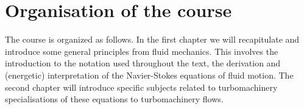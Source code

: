 
\section{Organisation of the course}

The course is organized as follows. In the first chapter we will
recapitulate and introduce some general principles from fluid
mechanics. This involves the introduction to the notation used
throughout the text, the derivation and (energetic) interpretation of
the Navier-Stokes equations of fluid motion. The second chapter will
introduce specific subjects related to turbomachinery specialisations
of these equations to turbomachinery flows.

